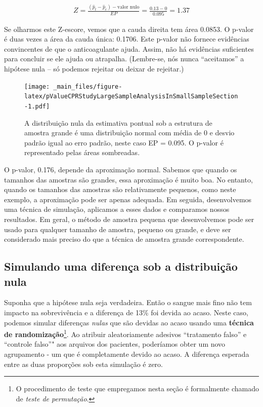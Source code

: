 \documentclass[
]{book}
\theoremstyle{definition}
\theoremstyle{definition}
\theoremstyle{definition}
\theoremstyle{definition}
\theoremstyle{remark}
\begin{document}
\begin{align*}
Z = \frac{(\hat{p}_t - \hat{p}_c) - \text{valor nulo}}{EP} = \frac{0.13 - 0}{0.095} = 1.37
\end{align*}

Se olharmos este Z-escore, vemos que a cauda direita tem área 0.0853. O p-valor é duas vezes a área da cauda única: 0.1706. Este p-valor não fornece evidências convincentes de que o anticoagulante ajuda. Assim, não há evidências suficientes para concluir se ele ajuda ou atrapalha. (Lembre-se, nós nunca ``aceitamos'' a hipótese nula -- só podemos rejeitar ou deixar de rejeitar.)

\begin{figure}
\centering
\texttt{[image: \_main\_files/figure-latex/pValueCPRStudyLargeSampleAnalysisInSmallSampleSection-1.pdf]}
\caption{\label{fig:pValueCPRStudyLargeSampleAnalysisInSmallSampleSection}A distribuição nula da estimativa pontual sob a estrutura de amostra grande é uma distribuição normal com média de 0 e desvio padrão igual ao erro padrão, neste caso EP = 0.095. O p-valor é representado pelas áreas sombreadas.}
\end{figure}

O p-valor, 0.176, depende da aproximação normal. Sabemos que quando os tamanhos das amostras são grandes, essa aproximação é muito boa. No entanto, quando os tamanhos das amostras são relativamente pequenos, como neste exemplo, a aproximação pode ser apenas adequada. Em seguida, desenvolvemos uma técnica de simulação, aplicamos a esses dados e comparamos nossos resultados. Em geral, o método de amostra pequena que desenvolvemos pode ser usado para qualquer tamanho de amostra, pequeno ou grande, e deve ser considerado mais preciso do que a técnica de amostra grande correspondente.

\hypertarget{simulatingDifferenceNullDistribution}{%
\subsection{Simulando uma diferença sob a distribuição nula}\label{simulatingDifferenceNullDistribution}}

Suponha que a hipótese nula seja verdadeira. Então o sangue mais fino não tem impacto na sobrevivência e a diferença de 13\% foi devida ao acaso. Neste caso, podemos simular diferenças \emph{nulas} que são devidas ao acaso usando uma \textbf{técnica de randomização}\footnote{O procedimento de teste que empregamos nesta seção é formalmente chamado de \emph{teste de permutação}.}. Ao atribuir aleatoriamente adesivos ``tratamento falso'' e ``controle falso''" aos arquivos dos pacientes, poderíamos obter um novo agrupamento - um que é completamente devido ao acaso. A diferença esperada entre as duas proporções sob esta simulação é zero.
\end{document}
